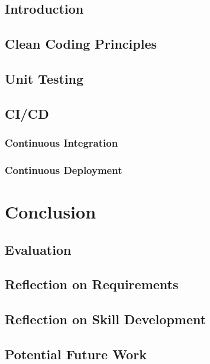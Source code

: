 \documentclass[a4paper,11pt]{report}
\begin{document}
\section{Introduction}
\section{Clean Coding Principles}
\section{Unit Testing}
\section{CI/CD}
\subsection{Continuous Integration}
\subsection{Continuous Deployment}

\chapter{Conclusion}
\section{Evaluation}
\section{Reflection on Requirements}
\section{Reflection on Skill Development}
\section{Potential Future Work}

\printbibliography
\end{document}
